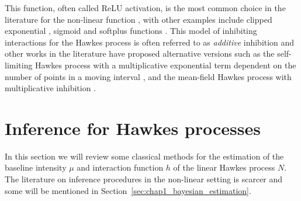 This function, often called ReLU activation, is the most common choice in the literature for the non-linear function \parencite{Lemonnier2014, Lu2018, Costa2020}, with other examples include clipped exponential \parencite{Chornoboy1988, Carstensen2010}, sigmoid \parencite{Menon2018} and softplus functions \parencite{Mei2017}.
This model of inhibiting interactions for the Hawkes process is often referred to as \emph{additive} inhibition and other works in the literature have proposed alternative versions such as the self-limiting Hawkes process with a multiplicative exponential term dependent on the number of points in a moving interval \parencite{Olinde2020}, and the mean-field Hawkes process with multiplicative inhibition \parencite{Duval2021}.


\section{Inference for Hawkes processes}\label{sec:chap1_inference}


In this section we will review some classical methods for the estimation of the baseline intensity $\mu$ and interaction function $h$ of the linear Hawkes process $N$.
The literature on inference procedures in the non-linear setting is scarcer and some will be mentioned in Section~\ref{sec:chap1_bayesian_estimation}.

